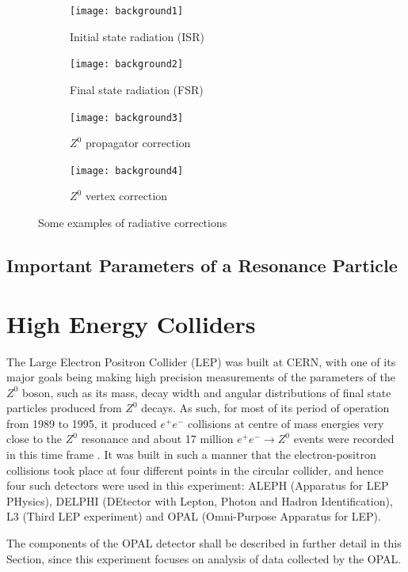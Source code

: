 \begin{figure}[H]
\centering
\begin{subfigure}{0.45\textwidth}
    \texttt{[image: background1]}
    \caption{Initial state radiation (ISR)}
\end{subfigure}
\begin{subfigure}{0.45\textwidth}
    \texttt{[image: background2]}
    \caption{Final state radiation (FSR)}
\end{subfigure}
\begin{subfigure}{0.45\textwidth}
    \texttt{[image: background3]}
    \caption{$Z^{0}$ propagator correction}
\end{subfigure}
\begin{subfigure}{0.45\textwidth}
    \texttt{[image: background4]}
    \caption{$Z^{0}$ vertex correction}
\end{subfigure}       
\caption{Some examples of radiative corrections \cite{UB}}
\label{fig:backfig}
\end{figure}

\subsection{Important Parameters of a Resonance Particle}

\section{High Energy Colliders}
The Large Electron Positron Collider (LEP) was built at CERN, with one of its major goals being making high precision measurements of the parameters of the $Z^{0}$ boson, such as its mass, decay width and angular distributions of final state particles produced from $Z^{0}$ decays. As such, for most of its period of operation from 1989 to 1995, it produced $e^{+}e^{-}$ collisions at centre of mass energies very close to the $Z^{0}$ resonance and about 17 million $e^{+}e^{-}\rightarrow Z^{0}$ events were recorded in this time frame \cite{thomson_2013}. It was built in such a manner that the electron-positron collisions took place at four different points in the circular collider, and hence four such detectors were used in this experiment: ALEPH (Apparatus for LEP PHysics), DELPHI (DEtector with Lepton, Photon and Hadron Identification), L3 (Third LEP experiment) and OPAL (Omni-Purpose Apparatus for LEP). 

The components of the OPAL detector shall be described in further detail in this Section, since this experiment focuses on analysis of data collected by the OPAL.

